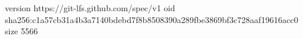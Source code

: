 version https://git-lfs.github.com/spec/v1
oid sha256:c1a57cb31a4b3a7140bdebd7f8b8508390a289fbe3869bf3c728aaf19616acc0
size 5566
